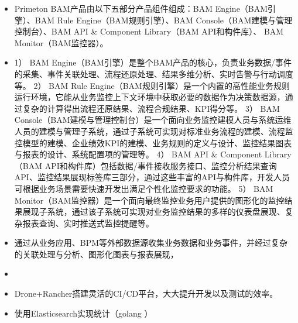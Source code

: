 \documentclass{resume}
\begin{document}
{\begin{itemize}
  3.	流程合规监控：
  从BPM或者业务系统实时地捕获流程执行过程和业务相关数据，进行流程还原并与标准流程进行对照，对“流程执行过程的合规性”（包括两类监控内容：①基础违规监控，比如步骤缺失/多余、次序错乱、岗位错误等；②业务关联违规，比如多级审批违规、操作规则违规、指标超限违规等）进行监控，使企业能够尽早识别流程执行中存在的风险，并采取相对应的风险应对措施。
  

  \item Primeton BAM产品由以下五部分产品组件组成：BAM Engine（BAM引擎）、BAM Rule Engine（BAM规则引擎）、BAM Console（BAM建模与管理控制台）、BAM API & Component Library（BAM API和构件库）、 BAM Monitor（BAM监控器）。
  \item 1）	BAM Engine（BAM引擎）是整个BAM产品的核心，负责业务数据/事件的采集、事件关联处理、流程还原处理、结果多维分析、实时告警与行动调度等。 
  2）	BAM Rule Engine（BAM规则引擎）是一个内置的高性能业务规则运行环境，它能从业务监控上下文环境中获取必要的数据作为决策数据源，通过复杂的计算得出流程还原结果、流程合规结果、KPI得分等。 
  3）	BAM Console（BAM建模与管理控制台）是一个面向业务监控建模人员与系统运维人员的建模与管理子系统，通过子系统可实现对标准业务流程的建模、流程监控模型的建模、企业绩效KPI的建模、业务规则的定义与设计、监控结果图表与报表的设计、系统配置项的管理等。 
  4）	BAM API & Component Library（BAM API和构件库）包括数据/事件接收服务接口、监控分析结果查询API、监控结果展现标签库三部分，通过这些丰富的API与构件库，开发人员可根据业务场景需要快速开发出满足个性化监控要求的功能。 
  5）	BAM Monitor（BAM监控器）是一个面向最终监控业务用户提供的图形化的监控结果展现子系统，通过该子系统可实现对业务监控结果的多样的仪表盘展现、复杂报表查询、实时推送式监控提醒等。
  
  
\end{itemize}



\vspace{0.5ex}
\begin{itemize}
  \item 通过从业务应用、BPM等外部数据源收集业务数据和业务事件，并经过复杂的关联处理与分析、图形化图表与报表展现，
  \item 
  \item Drone+Rancher搭建灵活的CI/CD平台，大大提升开发以及测试的效率。
  \item 使用Elasticsearch实现统计（golang ）
\end{itemize}



}
\end{document}
